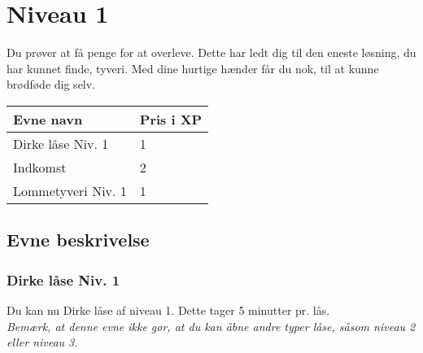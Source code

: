 \chapter{Niveau 1}
Du prøver at få penge for at overleve. Dette har ledt dig til den eneste løsning, du har kunnet finde, tyveri. Med dine hurtige hænder får du nok, til at kunne brødføde dig selv.
\begin{table}[H]
    \centering
    \begin{tabular}{|p{}|p{}|}
    \rowcolor{cerulean!80}\hline
        Evne navn & Pris i XP \\\hline
         Dirke låse Niv. 1 & 1 \\\hline
         Indkomst & 2 \\\hline
         Lommetyveri Niv. 1 & 1\\
         \hline
    \end{tabular}
\end{table}

\section{Evne beskrivelse}

\subsection{Dirke låse Niv. 1}
Du kan nu Dirke låse af niveau 1. Dette tager 5 minutter pr. lås.\\
\emph{Bemærk, at denne evne ikke gør, at du kan åbne andre typer låse, såsom niveau 2 eller niveau 3.}\\




